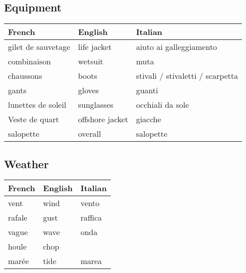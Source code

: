 \documentclass[a4paper, 12pt, twoside]{article}
\begin{document}
    \begin{indt}{\section{Equipment}} %
        \begin{tabular}{|l|l|l|}
            \hline %
            \textbf{French}
            & \textbf{English}
            & \textbf{Italian}
            \\
            \hline
            \hline %
            gilet de sauvetage %
            & life jacket
            & aiuto ai galleggiamento
            \\
            \hline %
            combinaison %
            & wetsuit
            & muta
            \\
            \hline %
            chaussons %
            & boots
            & stivali / stivaletti / scarpetta
            \\
            \hline %
            gants %
            & gloves
            & guanti
            \\
            \hline %
            lunettes de soleil %
            & sunglasses
            & occhiali da sole
            \\
            \hline %
            Veste de quart %
            & offshore jacket
            & giacche
            \\
            \hline %
            salopette %
            & overall
            & salopette
            \\
            \hline %
        \end{tabular}
    \end{indt} %

    \begin{indt}{\section{Weather}} %
        \begin{tabular}{|l|l|l|}
            \hline %
            \textbf{French}
            & \textbf{English}
            & \textbf{Italian}
            \\
            \hline
            \hline %
            vent %
            & wind
            & vento
            \\
            \hline %
            rafale %
            & gust
            & raffica
            \\
            \hline %
            vague %
            & wave
            & onda
            \\
            \hline %
            houle %
            & chop
            &
            \\
            \hline %
            marée %
            & tide
            & marea
            \\
            \hline %
        \end{tabular}
    \end{indt} %
\end{document}
